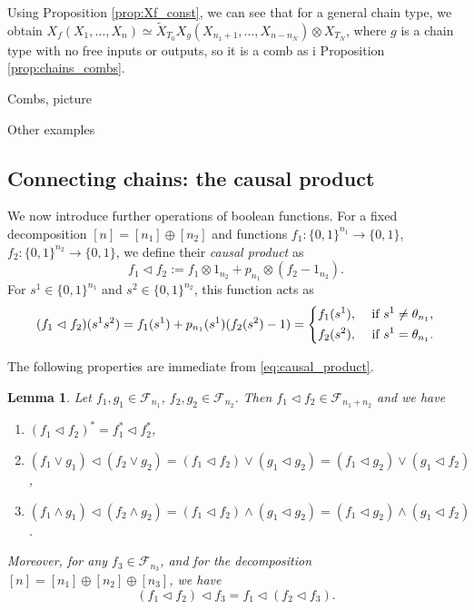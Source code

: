 \documentclass[12pt]{article}
\newtheorem{lemma}{Lemma}
\theoremstyle{definition}
\theoremstyle{remark}
\newtheorem{remark}{Remark}
\def\Fe{\mathcal F}
\def\vtl{\vartriangleleft}
\begin{document}
Using Proposition \ref{prop:Xf_const}, we can see that for a general chain type, we obtain
$X_f(X_1,\dots,X_n)\simeq \tilde X_{T_0} X_g(X_{n_1+1},\dots,X_{n-n_N})\otimes X_{T_N}$,
where $g$ is a chain type with no free inputs or outputs, so it is a comb as i Proposition
\ref{prop:chains_combs}.





Combs, picture

Other examples



\subsection{Connecting chains: the causal product}


We now  introduce further operations of boolean functions. 
For a fixed decomposition $[n]=[n_1]\oplus[n_2]$ and functions
$f_1:\{0,1\}^{n_1}\to \{0,1\}$, $f_2:\{0,1\}^{n_2}\to \{0,1\}$, we define their {\em
causal product} as 
\[
f_1\vartriangleleft f_2:=f_1\otimes 1_{n_2}+p_{n_1}\otimes (f_2-1_{n_2}).
\]
For  $s^1\in \{0,1\}^{n_1}$ and $s^2\in \{0,1\}^{n_2}$, this function acts as
\begin{equation}\label{eq:causal_product}
(f_1\vtl f_2)(s^1s^2)= f_1(s^1)+p_{n_1}(s^1)(f_2(s^2)-1)=\begin{dcases} f_1(s^1), &
\text{ if } s^1\ne \theta_{n_1},\\
   f_2(s^2), & \text{ if } s^1=\theta_{n_1}.
   \end{dcases}
\end{equation}

%
%
%
The following properties are immediate from \eqref{eq:causal_product}. 

\begin{lemma}\label{lemma:causal_product}
Let $f_1,g_1\in \Fe_{n_1}$, $f_2,g_2\in \Fe_{n_2}$. Then $f_1\vartriangleleft f_2\in \Fe_{n_1+n_2}$ and we
have 
\begin{enumerate}
\item[(i)] $(f_1\vtl f_2)^*=f_1^*\vtl f_2^*$,
\item[(ii)]$(f_1\vee g_1)\vtl (f_2\vee g_2)=(f_1\vtl f_2)\vee ( g_1\vtl g_2)=(f_1\vtl
g_2)\vee (g_1\vtl f_2)$,
\item[(iii)] $(f_1\wedge g_1)\vtl (f_2\wedge g_2)=(f_1\vtl f_2)\wedge ( g_1\vtl g_2)=(f_1\vtl
g_2)\wedge (g_1\vtl f_2)$.
\end{enumerate}
Moreover, for any $f_3\in \Fe_{n_3}$, and for the decomposition $[n]=[n_1]\oplus
[n_2]\oplus [n_3]$, we have 
\[
(f_1\vtl f_2)\vtl f_3=f_1\vtl (f_2\vtl f_3).
\]
\end{lemma}
\end{document}
